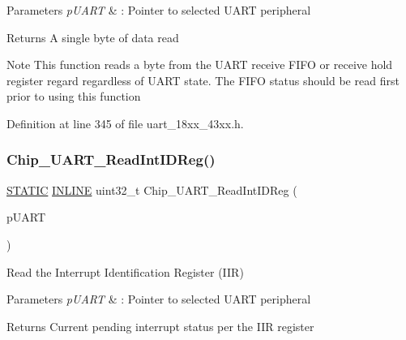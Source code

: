 \begin{DoxyParams}{Parameters}
{\em p\+U\+A\+RT} & \+: Pointer to selected U\+A\+RT peripheral \\
\hline
\end{DoxyParams}
\begin{DoxyReturn}{Returns}
A single byte of data read 
\end{DoxyReturn}
\begin{DoxyNote}{Note}
This function reads a byte from the U\+A\+RT receive F\+I\+FO or receive hold register regard regardless of U\+A\+RT state. The F\+I\+FO status should be read first prior to using this function 
\end{DoxyNote}


Definition at line 345 of file uart\+\_\+18xx\+\_\+43xx.\+h.

\mbox{\label{group___u_a_r_t__18_x_x__43_x_x_ga6a69343d3d7025055dd2326a8fdd3c74}} 
\subsubsection{\texorpdfstring{Chip\+\_\+\+U\+A\+R\+T\+\_\+\+Read\+Int\+I\+D\+Reg()}{Chip\_UART\_ReadIntIDReg()}}
{\footnotesize\ttfamily \hyperlink{group___l_p_c___types___public___macros_ga10b2d890d871e1489bb02b7e70d9bdfb}{S\+T\+A\+T\+IC} \hyperlink{spifi__18xx__43xx_8h_a2eb6f9e0395b47b8d5e3eeae4fe0c116}{I\+N\+L\+I\+NE} uint32\+\_\+t Chip\+\_\+\+U\+A\+R\+T\+\_\+\+Read\+Int\+I\+D\+Reg (\begin{DoxyParamCaption}\item[{\hyperlink{struct_l_p_c___u_s_a_r_t___t}{L\+P\+C\+\_\+\+U\+S\+A\+R\+T\+\_\+T} $\ast$}]{p\+U\+A\+RT }\end{DoxyParamCaption})}



Read the Interrupt Identification Register (I\+IR) 


\begin{DoxyParams}{Parameters}
{\em p\+U\+A\+RT} & \+: Pointer to selected U\+A\+RT peripheral \\
\hline
\end{DoxyParams}
\begin{DoxyReturn}{Returns}
Current pending interrupt status per the I\+IR register 
\end{DoxyReturn}


